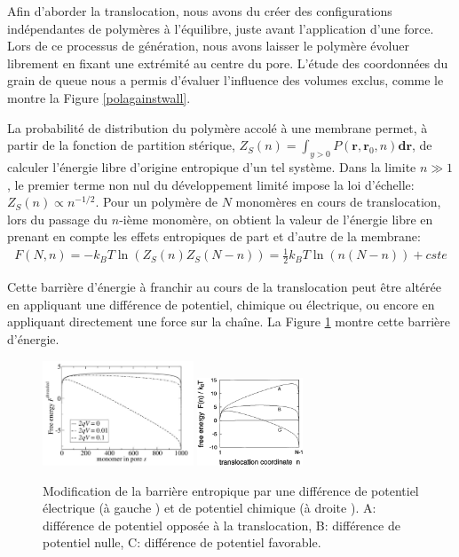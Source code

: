\documentclass[a4paper,11pt]{article}
\begin{document}
Afin d'aborder la translocation, nous avons du créer des configurations indépendantes de polymères à l'équilibre, juste avant l'application d'une force. Lors de ce processus de génération, nous avons laisser le polymère évoluer librement en fixant une extrémité au centre du pore. L'étude des coordonnées du grain de queue nous a permis d'évaluer l'influence des volumes exclus, comme le montre la Figure \ref{polagainstwall}.


La probabilité de distribution du polymère accolé à une membrane permet, à partir de la fonction de partition stérique, $Z_S(n)= \int_{y>0} P(\textbf{r},\textbf{r}_0,n) \textbf{dr}$, de calculer l'énergie libre d'origine entropique d'un tel système. Dans la limite $n \gg 1$, le premier terme non nul du développement limité impose la loi d'échelle: $Z_S(n) \propto n^{-1/2}$. Pour un polymère de $N$ monomères en cours de translocation, lors du passage du $n$-ième monomère, on obtient la valeur de l'énergie libre en prenant en compte les effets entropiques de part et d'autre de la membrane:
\begin{eqnarray}
F(N,n)= -k_BT\ln\left(Z_S(n)Z_S(N-n)\right)= \frac{1}{2} k_BT \ln \left(n(N-n)\right) +cste
\end{eqnarray}

Cette barrière d'énergie à franchir au cours de la translocation peut être altérée en appliquant une différence de potentiel, chimique ou électrique, ou encore en appliquant directement une force sur la chaîne. La Figure \ref{energiebarrier} montre cette barrière d'énergie.
\begin{figure}[H]
\begin{center}
\includegraphics[width=0.4\textwidth]{transelec.jpg} \includegraphics[width=0.28\textwidth]{transpotchim.jpg}

\caption{Modification de la barrière entropique par une différence de potentiel électrique (à gauche \cite{these}) et de potentiel chimique (à droite \cite{sung}). A: différence de potentiel opposée à la translocation, B: différence de potentiel nulle, C: différence de potentiel favorable.}
\label{energiebarrier}
\end{center}
\end{figure}
\end{document}

